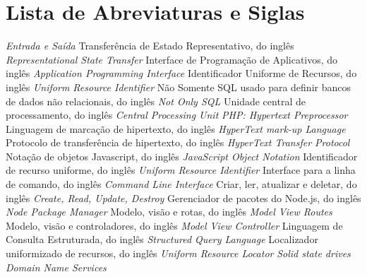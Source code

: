 \chapter*{Lista de Abreviaturas e Siglas}


\begin{acronym}
 {\textit{Entrada e Saída}}
 {Transferência de Estado Representativo, do inglês \textit{Representational State Transfer}}
 {Interface de Programação de Aplicativos, do inglês \textit{Application Programming Interface}}
 {Identificador Uniforme de Recursos, do inglês \textit{Uniform Resource Identifier}}
 {Não Somente SQL usado para definir bancos de dados não relacionais, do inglês \textit{Not Only SQL}}
 {Unidade central de processamento, do inglês \textit{Central Processing Unit}}
 {\textit{PHP: Hypertext Preprocessor}}
 {Linguagem de marcação de hipertexto, do inglês \textit{HyperText mark-up Language}}
 {Protocolo de transferência de hipertexto, do inglês \textit{HyperText Transfer Protocol}}
 {Notação de objetos Javascript, do inglês \textit{JavaScript Object Notation}}
 {Identificador de recurso uniforme, do inglês \textit{Uniform Resource Identifier}}
 {Interface para a linha de comando, do inglês \textit{Command Line Interface}}
 {Criar, ler, atualizar e deletar, do inglês \textit{Create, Read, Update, Destroy}}
 {Gerenciador de pacotes do Node.js, do inglês \textit{Node Package Manager}}
 {Modelo, visão e rotas, do inglês \textit{Model View Routes}}
 {Modelo, visão e controladores, do inglês \textit{Model View Controller}}
 {Linguagem de Consulta Estruturada, do inglês \textit{Structured Query Language}}
 {Localizador uniformizado de recursos, do inglês \textit{Uniform Resource Locator}}
 {\textit{Solid state drives}}
 {\textit{Domain Name Services}}



\end{acronym}
